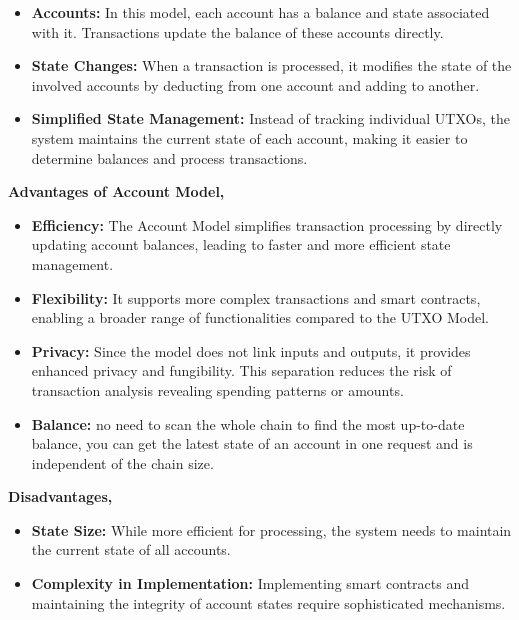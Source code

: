 \documentclass[12pt,a4paper,twocolumn]{article}
\begin{document}
\begin{itemize}
    \item \textbf{Accounts:} In this model, each account has a balance and state associated with it. Transactions update the balance of these accounts directly.\\
    
    \item \textbf{State Changes:} When a transaction is processed, it modifies the state of the involved accounts by deducting from one account and adding to another.\\
    
    \item \textbf{Simplified State Management:} Instead of tracking individual UTXOs, the system maintains the current state of each account, making it easier to determine balances and process transactions.\\
\end{itemize}

\textbf{Advantages of Account Model,} \\
\begin{itemize}
\item \textbf{Efficiency:} The Account Model simplifies transaction processing by directly updating account balances, leading to faster and more efficient state management.\\

\item \textbf{Flexibility:} It supports more complex transactions and smart contracts, enabling a broader range of functionalities compared to the UTXO Model.\\

\item \textbf{Privacy:} Since the model does not link inputs and outputs, it provides enhanced privacy and fungibility. This separation reduces the risk of transaction analysis revealing spending patterns or amounts.\\

\item \textbf{Balance:} no need to scan the whole chain to find the most up-to-date balance, you can get the latest state of an account in one request and is independent of the chain size.\\
\end{itemize}
\textbf{Disadvantages,} \\
\begin{itemize}
\item \textbf{State Size:} While more efficient for processing, the system needs to maintain the current state of all accounts. 

\item \textbf{Complexity in Implementation:} Implementing smart contracts and maintaining the integrity of account states require sophisticated mechanisms.\\
\end{itemize}
\end{document}

